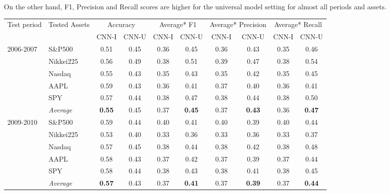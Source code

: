 \documentclass[11pt, a4paper]{article}
\begin{document}
On the other hand, F1, Precision and Recall scores are higher for the universal model setting for almost all periods and assets.

\begin{table}[H]
\begin{tabular}{l|l|cc|cc|cc|cc}
\multicolumn{1}{m{1cm}|}{\multirow{2}{1cm}{Test period}} & \multicolumn{1}{m{1.5cm}|}{\multirow{2}{1.5cm}{Tested Assets}} & \multicolumn{2}{c|}{Accuracy} & \multicolumn{2}{c|}{Average* F1} & \multicolumn{2}{c|}{Average* Precision} & \multicolumn{2}{c}{Average* Recall}  \\
\cline{3-10}
&& CNN-I & CNN-U & CNN-I & CNN-U & CNN-I & CNN-U & CNN-I & CNN-U \\ \hline \hline
\multirow{6}{1cm}{2006-2007} & S\&P500          & 0.51          & 0.45 & 0.36 & 0.45          & 0.36 & 0.43          & 0.35 & 0.46          \\
& Nikkei225        & 0.56          & 0.49 & 0.38 & 0.51          & 0.39 & 0.47          & 0.38 & 0.54          \\
& Nasdaq           & 0.55          & 0.43 & 0.35 & 0.43          & 0.35 & 0.42          & 0.35 & 0.45          \\
& AAPL             & 0.59          & 0.43 & 0.36 & 0.41          & 0.37 & 0.40          & 0.36 & 0.41          \\
& SPY              & 0.57          & 0.44 & 0.38 & 0.47          & 0.38 & 0.44          & 0.38 & 0.50          \\ \cline{2-10}
& \textit{Average} & \textbf{0.55} & 0.45 & 0.37 & \textbf{0.45} & 0.37 & \textbf{0.43} & 0.36 & \textbf{0.47} \\ \hline
\multirow{6}{1cm}{2009-2010} & S\&P500          & 0.59          & 0.44 & 0.40 & 0.41          & 0.40 & 0.39          & 0.40 & 0.44          \\
& Nikkei225        & 0.53          & 0.40 & 0.33 & 0.36          & 0.33 & 0.36          & 0.33 & 0.37          \\
& Nasdaq           & 0.57          & 0.45 & 0.38 & 0.44          & 0.38 & 0.42          & 0.38 & 0.48          \\
& AAPL             & 0.58          & 0.43 & 0.37 & 0.42          & 0.37 & 0.39          & 0.37 & 0.44          \\
& SPY              & 0.58          & 0.44 & 0.38 & 0.43          & 0.38 & 0.41          & 0.38 & 0.45          \\ \cline{2-10}
& \textit{Average} & \textbf{0.57} & 0.43 & 0.37 & \textbf{0.41} & 0.37 & \textbf{0.39} & 0.37 & \textbf{0.44} \\ \hline

\end{tabular}
\end{table}
\end{document}
